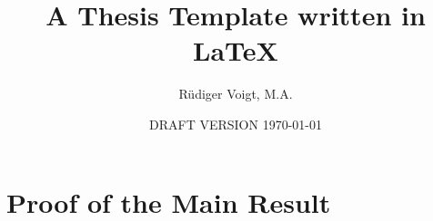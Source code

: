 \documentclass[10pt, oneside]{book}
\title{A Thesis Template written in \LaTeX}
\author{\foreignlanguage{ngerman}{Rüdiger Voigt, M.A.}}
\date{DRAFT VERSION \today}
\begin{document}


\frontmatter
\tableofcontents
\listoffigures
\listoftables

\mainmatter
\onehalfspacing 




\appendix
\chapter{Proof of the Main Result}

\backmatter
\printindex
\printbibliography
\end{document}

